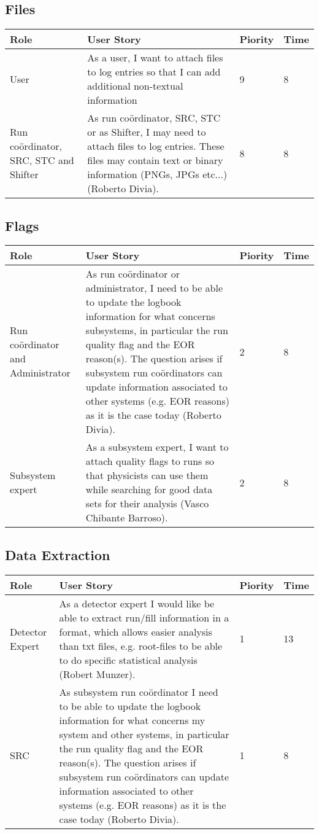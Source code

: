 \subsection{Files}
\begin{longtable}{ | p{2cm} | p{8cm} | p{1.5cm} | l |}
\hline
Role & User Story & Piority & Time \\ \hline
User &  As a user, I want to attach files to log entries so that I can add additional non-textual information & 9 & 8 \\ \hline
Run coördinator, SRC, STC and Shifter& As run coördinator, SRC, STC or as Shifter, I may need to attach files to log entries. These files may contain text or binary information (PNGs, JPGs etc...) (Roberto Divia). & 8 & 8 \\ \hline

\end{longtable}
\newpage
\subsection{Flags}
\begin{longtable}{ | p{2cm} | p{8cm} | p{1.5cm} | l |}
\hline
Role & User Story & Piority & Time \\ \hline
Run coördinator and Administrator &  As run coördinator or administrator, I need to be able to update the logbook information for what concerns subsystems, in particular the run quality flag and the EOR reason(s). The question arises if subsystem run coördinators can update information associated to other systems (e.g. EOR
reasons) as it is the case today (Roberto Divia). & 2 & 8 \\ \hline
Subsystem expert & As a subsystem expert, I want to attach quality flags to runs so that
physicists can use them while searching for good data sets for their analysis (Vasco Chibante Barroso). & 2 & 8 \\ \hline
\end{longtable}

\subsection{Data Extraction}
\begin{longtable}{ | p{2cm} | p{8cm} | p{1.5cm} | l |}
\hline
Role & User Story & Piority & Time \\ \hline
Detector Expert & As a detector expert I would like be able to extract run/fill information in a format, which allows easier analysis than txt files, e.g. root-files to be able to do specific statistical analysis (Robert Munzer). & 1 & 13 \\ \hline
SRC &  As subsystem run coördinator I need to be able to update the logbook information for what concerns my system and other systems, in particular the run quality flag and the EOR reason(s). The question arises if subsystem run coördinators can update information associated to other systems (e.g. EOR reasons) as it is the case today (Roberto Divia). & 1 & 8 \\ \hline

\end{longtable}
\newpage

